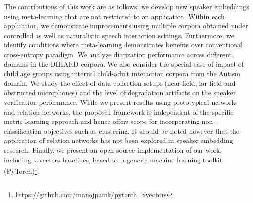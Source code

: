 The contributions of this work are as follows: we develop new speaker embeddings using meta-learning that are not restricted to an application.
Within each application, we demonstrate improvements using multiple corpora obtained under controlled as well as naturalistic speech interaction settings.
Furthermore, we identify conditions where meta-learning demonstrates benefits over conventional cross-entropy paradigm. 
We analyze diarization performance across different domains in the DIHARD corpora. We also consider the special case of impact of child age groups using internal child-adult interaction corpora from the Autism domain. We study the effect of data collection setups (near-field, far-field and obstructed microphones) and the level of degradation artifacts on the speaker verification performance.
While we present results using prototypical networks and relation networks, the proposed framework is independent of the specific metric-learning approach and hence offers scope for incorporating non-classification objectives such as clustering. It should be noted however that the application of relation networks has not been explored in speaker embedding research.
Finally, we present an open source implementation of our work, including x-vectors baselines, based on a generic machine learning toolkit (PyTorch)\footnote{https://github.com/manojpamk/pytorch\_xvectors}.








